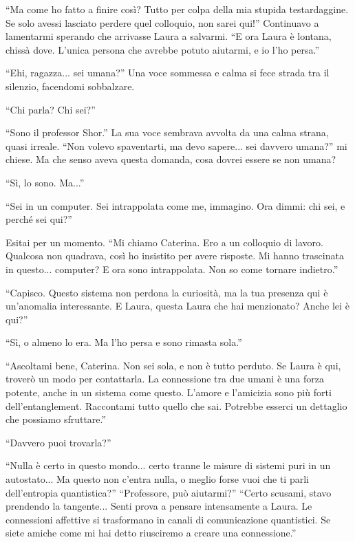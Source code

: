 \begin{dialogue}
 \enquote{Ma come ho fatto a finire così? Tutto per colpa della mia stupida testardaggine. Se solo avessi lasciato perdere quel colloquio, non sarei qui!} Continuavo a lamentarmi sperando che arrivasse Laura a salvarmi. \enquote{E ora Laura è lontana, chissà dove. L'unica persona che avrebbe potuto aiutarmi, e io l'ho persa.}

 \enquote{Ehi, ragazza... sei umana?} Una voce sommessa e calma si fece strada tra il silenzio, facendomi sobbalzare.

 \enquote{Chi parla? Chi sei?}

 \enquote{Sono il professor Shor.} La sua voce sembrava avvolta da una calma strana, quasi irreale. \enquote{Non volevo spaventarti, ma devo sapere... sei davvero umana?} mi chiese. Ma che senso aveva questa domanda, cosa dovrei essere se non umana?

 \enquote{Sì, lo sono. Ma...} 

 \enquote{Sei in un computer. Sei intrappolata come me, immagino. Ora dimmi: chi sei, e perché sei qui?}

 Esitai per un momento. \enquote{Mi chiamo Caterina. Ero a un colloquio di lavoro. Qualcosa non quadrava, così ho insistito per avere risposte. Mi hanno trascinata in questo... computer? E ora sono intrappolata. Non so come tornare indietro.}

 \enquote{Capisco. Questo sistema non perdona la curiosità, ma la tua presenza qui è un'anomalia interessante. E Laura, questa Laura che hai menzionato? Anche lei è qui?}

 \enquote{Sì, o almeno lo era. Ma l'ho persa e sono rimasta sola.}

 \enquote{Ascoltami bene, Caterina. Non sei sola, e non è tutto perduto. Se Laura è qui, troverò un modo per contattarla. La connessione tra due umani è una forza potente, anche in un sistema come questo. L'amore e l'amicizia sono più forti dell'entanglement. Raccontami tutto quello che sai. Potrebbe esserci un dettaglio che possiamo sfruttare.}

 \enquote{Davvero puoi trovarla?}

 \enquote{Nulla è certo in questo mondo... certo tranne le misure di sistemi puri in un autostato... Ma questo non c'entra nulla, o meglio forse vuoi che ti parli dell'entropia quantistica?}
 \enquote{Professore, può aiutarmi?}
 \enquote{Certo scusami, stavo prendendo la tangente... Senti prova a pensare intensamente a Laura. Le connessioni affettive si trasformano in canali di comunicazione quantistici. Se siete amiche come mi hai detto riusciremo a creare una connessione.}
\end{dialogue}

